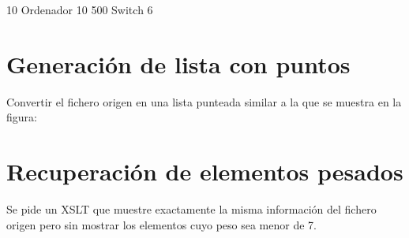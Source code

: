 \documentclass[letterpaper,10pt,spanish]{sphinxmanual}
\begin{document}
\begin{sphinxVerbatim}[commandchars=\\\{\}]
     
         10
        Ordenador
         
            10
     
         500
        Switch
         
            6
\end{sphinxVerbatim}


\section{Generación de lista con puntos}
\label{\detokenize{ejercicios/xslt/anexo_ejercicios_xslt:generacion-de-lista-con-puntos}}
Convertir el fichero origen en una lista punteada similar a la que se muestra en la figura:



\section{Recuperación de elementos pesados}
\label{\detokenize{ejercicios/xslt/anexo_ejercicios_xslt:recuperacion-de-elementos-pesados}}
Se pide un XSLT que muestre exactamente la misma información del fichero origen pero sin mostrar los elementos cuyo peso sea menor de 7.
\end{document}
